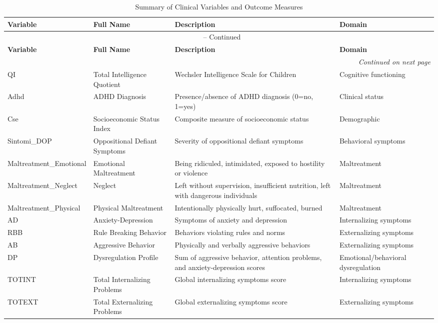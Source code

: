 \begin{longtable}{p{2.5cm} p{3cm} p{7cm} p{2.5cm}}
\caption{Summary of Clinical Variables and Outcome Measures}
\label{tab:clinical_variables}\\ 
\hline
\textbf{Variable} & \textbf{Full Name} & \textbf{Description} & \textbf{Domain} \\ 
\hline
\endfirsthead
\multicolumn{4}{c}{\tablename\ \thetable{} -- Continued} \\ 
\hline
\textbf{Variable} & \textbf{Full Name} & \textbf{Description} & \textbf{Domain} \\ 
\hline
\endhead
\hline \multicolumn{4}{r}{\textit{Continued on next page}} \\ 
\endfoot
\hline
\endlastfoot
QI & Total Intelligence Quotient & Wechsler Intelligence Scale for Children & Cognitive functioning \\ 
Adhd & ADHD Diagnosis & Presence/absence of ADHD diagnosis (0=no, 1=yes) & Clinical status \\ 
Cse & Socioeconomic Status Index & Composite measure of socioeconomic status & Demographic \\ 
Sintomi_DOP & Oppositional Defiant Symptoms & Severity of oppositional defiant symptoms & Behavioral symptoms \\ 
Maltreatment_Emotional & Emotional Maltreatment & Being ridiculed, intimidated, exposed to hostility or violence & Maltreatment \\ 
Maltreatment_Neglect & Neglect & Left without supervision, insufficient nutrition, left with dangerous individuals & Maltreatment \\ 
Maltreatment_Physical & Physical Maltreatment & Intentionally physically hurt, suffocated, burned & Maltreatment \\ 
AD & Anxiety-Depression & Symptoms of anxiety and depression & Internalizing symptoms \\ 
RBB & Rule Breaking Behavior & Behaviors violating rules and norms & Externalizing symptoms \\ 
AB & Aggressive Behavior & Physically and verbally aggressive behaviors & Externalizing symptoms \\ 
DP & Dysregulation Profile & Sum of aggressive behavior, attention problems, and anxiety-depression scores & Emotional/behavioral dysregulation \\ 
TOTINT & Total Internalizing Problems & Global internalizing symptoms score & Internalizing symptoms \\ 
TOTEXT & Total Externalizing Problems & Global externalizing symptoms score & Externalizing symptoms \\ 

\end{longtable}
